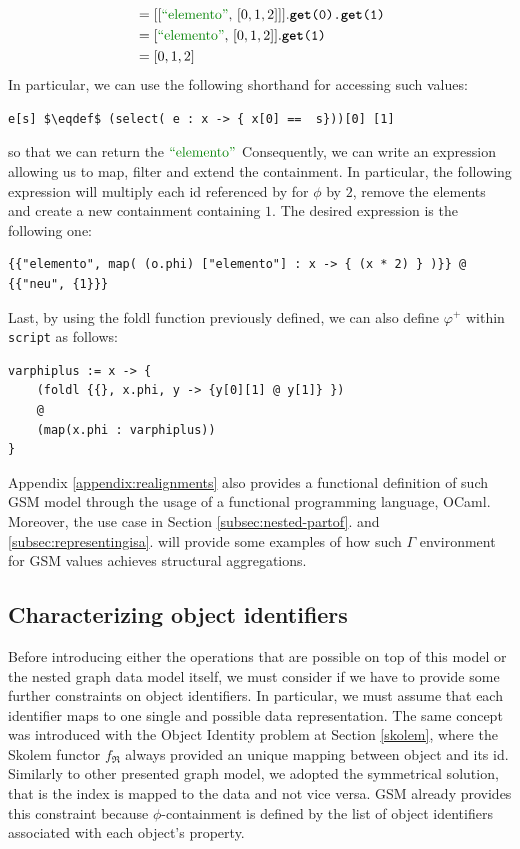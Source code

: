 \begin{example}
\begin{align*}
	&= [[\mstr{elemento},\, [0,1,2]]].\texttt{\textbf{get}(0).\textbf{get}(1)}\\
	&= [\mstr{elemento},\, [0,1,2]].\texttt{\textbf{get}(1)}\\
	&= [0,1,2]\\
	\end{align*}
	In particular, we can use the following shorthand for accessing such values:
\begin{lstlisting}[language=Script,mathescape=true]
e[s] $\eqdef$ (select( e : x -> { x[0] ==  s}))[0] [1]
\end{lstlisting}
	so that we can return the  $\mstr{elemento}$  Consequently, we can write an expression allowing us to map, filter and extend the containment. In particular, the following expression will multiply each id referenced by  for $\phi$ by $2$, remove the  elements and create a new containment  containing $1$. The desired expression is the following one:
\begin{lstlisting}[language=Script]
{{"elemento", map( (o.phi) ["elemento"] : x -> { (x * 2) } )}} @ {{"neu", {1}}}
\end{lstlisting}
\end{example}

Last, by using the foldl function previously defined, we can also define $\varphi^+$ within \texttt{script} as follows:
\begin{lstlisting}[language=Script]
varphiplus := x -> {
	(foldl {{}, x.phi, y -> {y[0][1] @ y[1]} })
	@
	(map(x.phi : varphiplus))
}
\end{lstlisting}

Appendix \vref{appendix:realignments} also provides a functional definition of such GSM model through the usage of a functional programming language, OCaml. Moreover, the use case in Section \vref{subsec:nested-partof}. and \vref{subsec:representingisa}. will provide some examples of how such $\Gamma$ environment for GSM values achieves structural aggregations.

\subsection{Characterizing object identifiers}
Before introducing either the operations that are possible on top of this model or the nested graph data model itself, we must consider if we have to provide some further constraints on  object identifiers. In particular, we must assume that each identifier maps to one single and possible data representation.  The same concept was introduced with the Object Identity problem at Section \vref{skolem}, where the Skolem functor $f_\Re$  always provided an unique mapping between object and its id. Similarly to other presented graph model, we adopted the symmetrical solution, that is the index is mapped to the data and not vice versa. GSM already provides this constraint because $\phi$-containment is defined by the list of object identifiers associated with each object's property.


